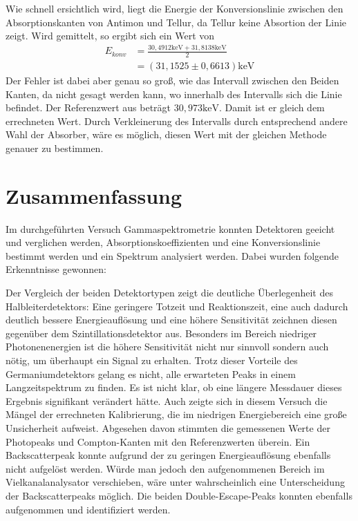 \documentclass[
	parskip=half,10pt,
	numbers= noenddot, %
	toc=flat, %
	oneside,
	twocolumn,
	]{scrartcl}
\begin{document}
Wie schnell ersichtlich wird, liegt die Energie der Konversionslinie zwischen den Absorptionskanten von Antimon und Tellur, da Tellur keine Absortion der Linie 
zeigt. Wird gemittelt, so ergibt sich ein Wert von 
\begin{align*}
E_{konv} &= \frac{30,4912 \si{\kilo \electronvolt} + 31,8138 \si{\kilo \electronvolt}}{2} \\ & = (31,1525  \pm 0,6613) \si{\kilo \electronvolt}
\end{align*}
Der Fehler ist dabei aber genau so groß, wie das Intervall zwischen den Beiden Kanten, da nicht gesagt werden kann, wo innerhalb des Intervalls sich die 
Linie befindet. Der Referenzwert aus \cite{isotopes} beträgt $30,973 \si{\kilo \electronvolt}$. Damit ist er gleich dem errechneten Wert. 
Durch Verkleinerung des Intervalls durch entsprechend andere Wahl der Absorber, wäre es möglich, diesen Wert mit der gleichen Methode genauer zu bestimmen. 

\section{Zusammenfassung}

Im durchgeführten Versuch Gammaspektrometrie konnten Detektoren geeicht und verglichen werden, Absorptionskoeffizienten und eine Konversionslinie bestimmt werden und 
ein Spektrum analysiert werden. Dabei wurden folgende Erkenntnisse gewonnen: 

Der Vergleich der beiden Detektortypen zeigt die deutliche Überlegenheit des Halbleiterdetektors: Eine geringere Totzeit und Reaktionszeit, eine auch dadurch 
deutlich bessere Energieauflösung und eine höhere Sensitivität zeichnen diesen gegenüber dem Szintillationsdetektor aus. Besonders im Bereich niedriger 
Photonenenergien ist die höhere Sensitivität nicht nur sinnvoll sondern auch nötig, um überhaupt ein Signal zu erhalten. 
Trotz dieser Vorteile des Germaniumdetektors gelang es nicht, alle erwarteten Peaks in einem Langzeitspektrum zu finden. Es ist nicht klar, ob eine längere 
Messdauer dieses Ergebnis signifikant verändert hätte. Auch zeigte sich in diesem Versuch die Mängel der errechneten Kalibrierung, die im niedrigen 
Energiebereich eine große Unsicherheit aufweist. Abgesehen davon stimmten die gemessenen Werte der Photopeaks und Compton-Kanten mit den Referenzwerten überein. 
Ein Backscatterpeak konnte aufgrund der zu geringen Energieauflösung ebenfalls nicht aufgelöst werden. Würde man jedoch den aufgenommenen Bereich im 
Vielkanalanalysator verschieben, wäre unter wahrscheinlich eine Unterscheidung der Backscatterpeaks möglich. Die beiden Double-Escape-Peaks konnten 
ebenfalls aufgenommen und identifiziert werden. 
\end{document}
